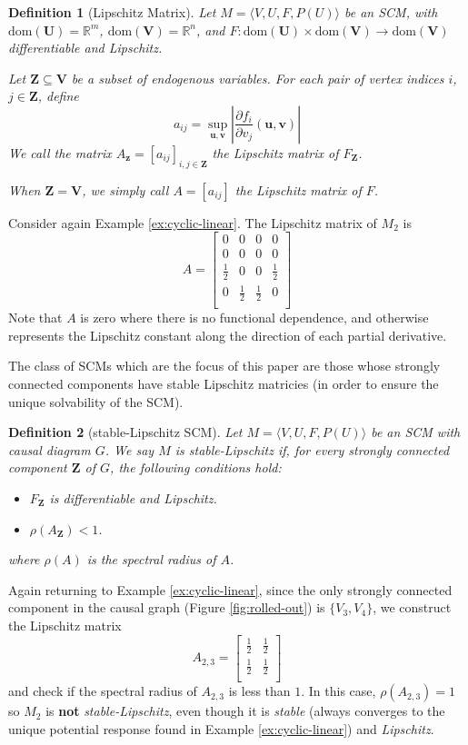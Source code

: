 \documentclass[letterpaper,10pt]{article}
\newtheorem{definition}{Definition}
\newcommand\R{\mathbb{R}}
\begin{document}
\begin{definition}[Lipschitz Matrix]
Let $M=\langle V,U,F,P(U)\rangle$ be an SCM, with $\text{dom}(\mathbf{U})=\R^m$, $\text{dom}(\mathbf{V})=\R^n$, and $F:\text{dom}(\mathbf{U})\times \text{dom}(\mathbf{V})\to\text{dom}(\mathbf{V})$ differentiable and Lipschitz.

Let $\mathbf{Z}\subseteq\mathbf{V}$ be a subset of endogenous variables.
For each pair of vertex indices $i$, $j\in\mathbf{Z}$, define
\[
a_{ij} = \sup_{\mathbf{u},\mathbf{v}} \left\lvert\frac{\partial f_i}{\partial v_j}(\mathbf{u},\mathbf{v})\right\rvert
\]
We call the matrix $A_{\mathbf{z}}=[a_{ij}]_{i,j\in\mathbf{Z}}$ the Lipschitz matrix of $F_\mathbf{Z}$.

When $\mathbf{Z}=\mathbf{V}$, we simply call $A=[a_{ij}]$ the Lipschitz matrix of $F$.
\end{definition}

Consider again Example \ref{ex:cyclic-linear}. The Lipschitz matrix of $M_2$ is 
\[
A =
\begin{bmatrix}
0 & 0 & 0 & 0 \\
0 & 0 & 0 & 0 \\
\frac{1}{2} & 0 & 0 & \frac{1}{2} \\
0 & \frac{1}{2} & \frac{1}{2} & 0 \\
\end{bmatrix}
\]
Note that $A$ is zero where there is no functional dependence, and otherwise represents the Lipschitz constant along the direction of each partial derivative.

The class of SCMs which are the focus of this paper are those whose strongly connected components have stable Lipschitz matricies (in order to ensure the unique solvability of the SCM).

\begin{definition}[stable-Lipschitz SCM]\label{stable-Lipschitz}
Let $M=\langle V,U,F,P(U)\rangle$ be an SCM with causal diagram $G$. 
We say $M$ is stable-Lipschitz if, for every strongly connected component $\mathbf{Z}$ of $G$, the following conditions hold:
\begin{itemize}
  \item $F_{\mathbf{Z}}$ is differentiable and Lipschitz.
  \item $\rho(A_\mathbf{Z})<1$.
\end{itemize}
where $\rho(A)$ is the spectral radius of $A$.
\end{definition}

Again returning to Example \ref{ex:cyclic-linear}, since the only strongly connected component in the causal graph (Figure \ref{fig:rolled-out}) is $\{V_3,V_4\}$, we construct the Lipschitz matrix
\[
A_{2,3} =
\begin{bmatrix}
\frac{1}{2} & \frac{1}{2} \\
\frac{1}{2} & \frac{1}{2} \\
\end{bmatrix}
\]
and check if the spectral radius of $A_{2,3}$ is less than $1$. In this case, $\rho(A_{2,3})=1$ so $M_2$ is \textbf{not} \emph{stable-Lipschitz}, even though it is \emph{stable} (always converges to the unique potential response found in Example \ref{ex:cyclic-linear}) and \emph{Lipschitz}.
\end{document}
